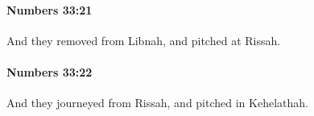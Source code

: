 		\paragraph{Numbers 33:21} %
			\label{NUMBERS-33-21}

			And they removed from Libnah, and pitched at Rissah.


		\paragraph{Numbers 33:22} %
			\label{NUMBERS-33-22}

			And they journeyed from Rissah, and pitched in Kehelathah.


